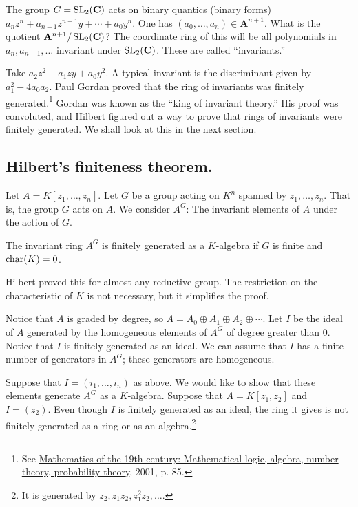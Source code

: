 \documentclass [11 pt, oneside] {article}
\begin{document}
\begin{example}\label{}
The group $G=\operatorname{SL}_{2}(\mathbf{C})$ acts on binary quantics (binary forms) $a_nz^n + a_{n-1}z^{n-1}y + \cdots +a_0y^n$. One has $(a_0,\hdots, a_n)\in \mathbf{A}^{n+1}$. What is the quotient $\mathbf{A}^{n+1}/\operatorname{SL}_{2}(\mathbf{C})$? The coordinate ring of this will be all polynomials in $a_n,a_{n-1},\hdots$ invariant under $\operatorname{SL}_{2}(\mathbf{C})$. These are called ``invariants.''

Take $a_2z^2 + a_1zy + a_0y^2$. A typical invariant is the discriminant given by $a_1^2 - 4a_0a_2$. Paul Gordan proved that the ring of invariants was finitely generated.\footnote{See \ul{Mathematics of the 19th century: Mathematical logic, algebra, number theory, probability theory}, 2001, p. 85.} Gordan was known as the ``king of invariant theory.'' His proof was convoluted, and Hilbert figured out a way to prove that rings of invariants were finitely generated. We shall look at this in the next section.
\end{example}

\subsection{Hilbert's finiteness theorem.}
Let $A = K[z_1,\hdots, z_n]$. Let $G$ be a group acting on $K^n$ spanned by $z_1,\hdots, z_n$. That is, the group $G$ acts on $A$. We consider $A^G$: The invariant elements of $A$ under the action of $G$.

\begin{theorem}[Hilbert]\label{}
The invariant ring $A^G$ is finitely generated as a $K$-algebra if $G$ is finite and $\operatorname{char}(K) = 0$.
\end{theorem}
\begin{remark}
	Hilbert proved this for almost any reductive group. The restriction on the characteristic of $K$ is not necessary, but it simplifies the proof.
\end{remark}

Notice that $A$ is graded by degree, so $A = A_0\oplus A_1\oplus A_2\oplus \cdots$. Let $I$ be the ideal of $A$ generated by the homogeneous elements of $A^G$ of degree greater than $0$. Notice that $I$ is finitely generated as an ideal. We can assume that $I$ has a finite number of generators in $A^G$; these generators are homogeneous. 

Suppose that $I=(i_1,\hdots,i_n)$ as above. We would like to show that these elements generate $A^G$ as a $K$-algebra. Suppose that $A=K[z_1,z_2]$ and $I = (z_2)$. Even though $I$ is finitely generated as an ideal, the ring it gives is not finitely generated as a ring or as an algebra.\footnote{It is generated by $z_2,z_1z_2, z_1^2z_2,\hdots$.} 
\end{document}
